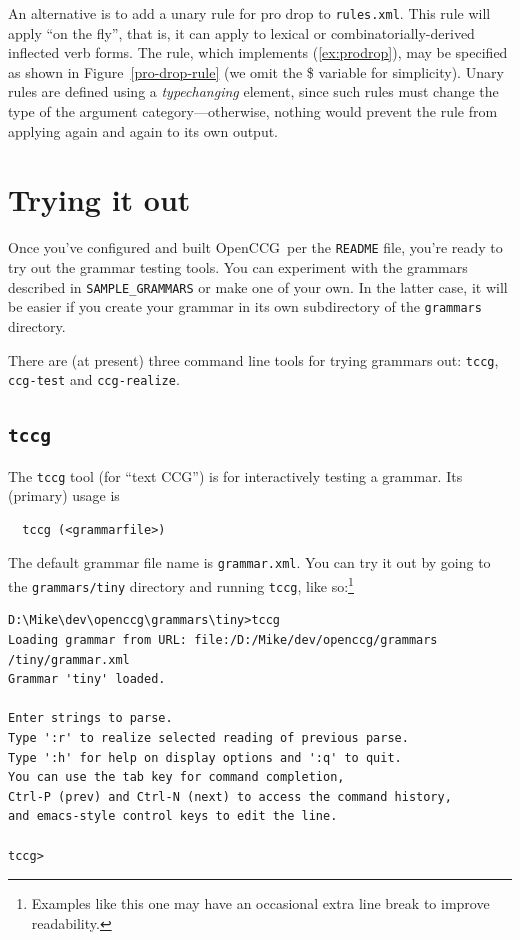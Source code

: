 \documentclass[11pt]{article}
\newcommand{\occg}{OpenCCG}
\begin{document}
An alternative is to add a unary rule for pro drop to
\texttt{rules.xml}. This rule will apply ``on the fly'', that is, it can
apply to lexical or combinatorially-derived inflected verb forms. The
rule, which implements (\ref{ex:prodrop}), may be specified as shown in
Figure~\ref{pro-drop-rule} (we omit the \$ variable for simplicity).
Unary rules are defined using a \textsl{typechanging} element, since
such rules must change the type of the argument category---otherwise,
nothing would prevent the rule from applying again and again to its own
output.


\section{Trying it out}

Once you've configured and built \occg\, per the \texttt{README} file,
you're ready to try out the grammar testing tools. You can experiment
with the grammars described in \texttt{SAMPLE\_GRAMMARS} or make one of
your own. In the latter case, it will be easier if you create your
grammar in its own subdirectory of the \texttt{grammars} directory.

There are (at present) three command line tools for trying grammars out:
\texttt{tccg}, \texttt{ccg-test} and \texttt{ccg-realize}.

\subsection{\texttt{tccg}}

The \texttt{tccg} tool (for ``text CCG'') is for interactively testing a
grammar. Its (primary) usage is

\begin{verbatim}
  tccg (<grammarfile>)
\end{verbatim}

\noindent The default grammar file name is \texttt{grammar.xml}. You can
try it out by going to the \texttt{grammars/tiny} directory and running
\texttt{tccg}, like so:\footnote{Examples like this one may have  
an occasional extra line break to improve readability.}

\begin{small}
\begin{verbatim}
D:\Mike\dev\openccg\grammars\tiny>tccg
Loading grammar from URL: file:/D:/Mike/dev/openccg/grammars
/tiny/grammar.xml
Grammar 'tiny' loaded.

Enter strings to parse.
Type ':r' to realize selected reading of previous parse.
Type ':h' for help on display options and ':q' to quit.
You can use the tab key for command completion,
Ctrl-P (prev) and Ctrl-N (next) to access the command history,
and emacs-style control keys to edit the line.

tccg>
\end{verbatim}
\end{small}
\end{document}
